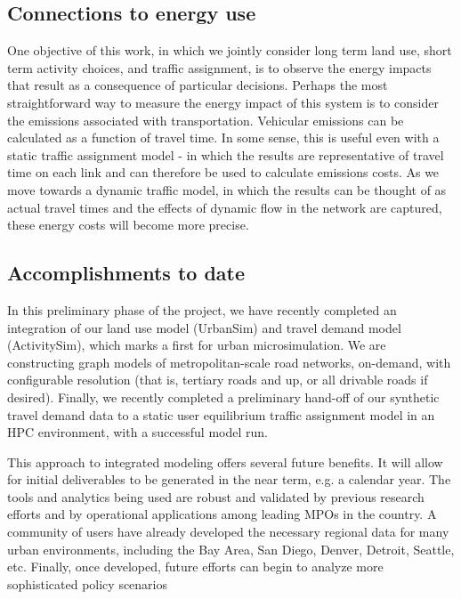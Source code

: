 \subsection{Connections to energy use}

One objective of this work, in which we jointly consider long term land use, short term activity choices, and traffic assignment, is to observe the energy impacts that result as a consequence of particular decisions. Perhaps the most straightforward way to measure the energy impact of this system is to consider the emissions associated with transportation. Vehicular emissions can be calculated as a function of travel time. In some sense, this is useful even with a static traffic assignment model - in which the results are representative of travel time on each link and can therefore be used to calculate emissions costs. As we move towards a dynamic traffic model, in which the results can be thought of as actual travel times and the effects of dynamic flow in the network are captured, these energy costs will become more precise. 

\subsection{Accomplishments to date}

In this preliminary phase of the project, we have recently completed an integration of our land use model (UrbanSim) and travel demand model (ActivitySim), which marks a first for urban microsimulation. We are constructing graph models of metropolitan-scale road networks, on-demand, with configurable resolution (that is, tertiary roads and up, or all drivable roads if desired). Finally, we recently completed a preliminary hand-off of our synthetic travel demand data to a static user equilibrium traffic assignment model in an HPC environment, with a successful model run.

This approach to integrated modeling offers several future benefits. It will allow for initial deliverables to be generated in the near term, e.g. a calendar year. The tools and analytics being used are robust and validated by previous research efforts and by operational applications among leading MPOs in the country. A community of users have already developed the necessary regional data for many urban environments, including the Bay Area, San Diego, Denver, Detroit, Seattle, etc. Finally, once developed, future efforts can begin to analyze more sophisticated policy scenarios

